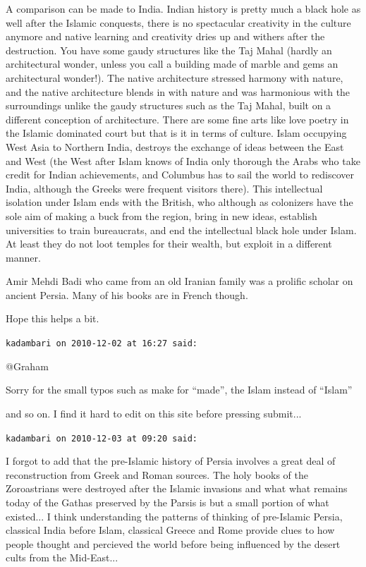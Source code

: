 \begin{footnotesize}
\begin{sffamily}
A comparison can be made to India. Indian history is pretty much a black hole as well after the Islamic conquests, there is no spectacular creativity in the culture anymore and native learning and creativity dries up and withers after the destruction. You have some gaudy structures like the Taj Mahal (hardly an architectural wonder, unless you call a building made of marble and gems an architectural wonder!). The native architecture stressed harmony with nature, and the native architecture blends in with nature and was harmonious with the surroundings unlike the gaudy structures such as the Taj Mahal, built on a different conception of architecture. There are some fine arts like love poetry in the Islamic dominated court but that is it in terms of culture. Islam occupying West Asia to Northern India, destroys the exchange of ideas between the East and West (the West after Islam knows of India only thorough the Arabs who take credit for Indian achievements, and Columbus has to sail the world to rediscover India, although the Greeks were frequent visitors there). This intellectual isolation under Islam ends with the British, who although as colonizers have the sole aim of making a buck from the region, bring in new ideas, establish universities to train bureaucrats, and end the intellectual black hole under Islam. At least they do not loot temples for their wealth, but exploit in a different manner.

Amir Mehdi Badi who came from an old Iranian family was a prolific scholar on ancient Persia. Many of his books are in French though.

Hope this helps a bit.

\hfill

\texttt{kadambari on 2010-12-02 at 16:27 said:}

@Graham

Sorry for the small typos such as make for ``made'', the Islam instead of ``Islam''

and so on. I find it hard to edit on this site before pressing submit... 

\hfill

\texttt{kadambari on 2010-12-03 at 09:20 said:}

I forgot to add that the pre-Islamic history of Persia involves a great deal of reconstruction from Greek and Roman sources. The holy books of the Zoroastrians were destroyed after the Islamic invasions and what what remains today of the Gathas preserved by the Parsis is but a small portion of what existed... I think understanding the patterns of thinking of pre-Islamic Persia, classical India before Islam, classical Greece and Rome provide clues to how people thought and percieved the world before being influenced by the desert cults from the Mid-East... 


\end{sffamily}
\end{footnotesize}
